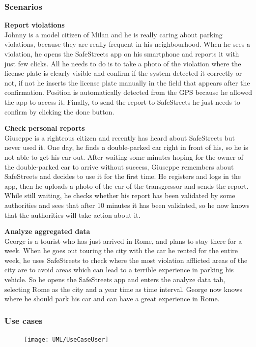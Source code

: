 \subsubsection{Scenarios}

\textbf{Report violations}\\
        Johnny is a model citizen of Milan and he is really caring about parking violations, because they are really frequent in his neighbourhood. When he sees a violation, he opens the SafeStreets app on his smartphone and reports it with just few clicks. All he needs to do is to take a photo of the violation where the license plate is clearly visible and confirm if the system detected it correctly or not, if not he inserts the license plate manually in the field that appears after the confirmation. Position is automatically detected from the GPS because he allowed the app to access it. Finally, to send the report to SafeStreets he just needs to confirm by clicking the done button.
        
\textbf{Check personal reports}\\
        Giuseppe is a righteous citizen and recently has heard about SafeStreets but never used it. One day, he finds a double-parked car right in front of his, so he is not able to get his car out. After waiting some minutes hoping for the owner of the double-parked car to arrive without success, Giuseppe remembers about SafeStreets and decides to use it for the first time. He registers and logs in the app, then he uploads a photo of the car of the transgressor and sends the report. While still waiting, he checks whether his report has been validated by some authorities and sees that after 10 minutes it has been validated, so he now knows that the authorities will take action about it.
        
\textbf{Analyze aggregated data}\\
        George is a tourist who has just arrived in Rome, and plans to stay there for a week. When he goes out touring the city with the car he rented for the entire week, he uses SafeStreets to check where the most violation afflicted areas of the city are to avoid areas which can lead to a terrible experience in parking his vehicle. So he opens the SafeStreets app and enters the analyze data tab, selecting Rome as the city and a year time as time interval. George now knows where he should park his car and can have a great experience in Rome.
        
\subsubsection{Use cases}
\begin{figure}[H]
	\centering
    \texttt{[image: UML/UseCaseUser]}
\end{figure}	



